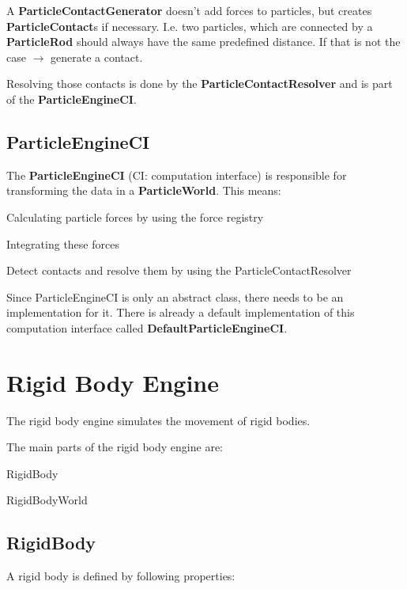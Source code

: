 \documentclass[12p, paper=a4, leqno, colorinlistoftodos]{article}
\newenvironment{packed_itemize}
{\begin{itemize}
		\setlength{\itemsep}{0pt}
		\setlength{\parskip}{0pt}
		\setlength{\parsep}{0pt}
	}{\end{itemize}}
\begin{document}
		A \textbf{ParticleContactGenerator} doesn't add forces to particles, but creates \textbf{ParticleContact}s if necessary. I.e. two particles, which are connected by a \textbf{ParticleRod} should always have the same predefined distance. If that is not the case $\rightarrow$ generate a contact.
		
		Resolving those contacts is done by the \textbf{ParticleContactResolver} and is part of the \textbf{ParticleEngineCI}.
		
		\subsection{ParticleEngineCI}
		The \textbf{ParticleEngineCI} (CI: computation interface) is responsible for transforming the data in a \textbf{ParticleWorld}. This means:
		\begin{packed_itemize}
			\item Calculating particle forces by using the force registry
			\item Integrating these forces
			\item Detect contacts and resolve them by using the ParticleContactResolver
		\end{packed_itemize}	
		Since ParticleEngineCI is only an abstract class, there needs to be an implementation for it. There is already a default implementation of this computation interface called \textbf{DefaultParticleEngineCI}.		
	
	\pagebreak
	\section{Rigid Body Engine}
		The rigid body engine simulates the movement of rigid bodies.
		
		The main parts of the rigid body engine are:
		\begin{packed_itemize}
			\item RigidBody
			\item RigidBodyWorld
		\end{packed_itemize}
	
		\subsection{RigidBody}
		A rigid body is defined by following properties:
		
\end{document}
